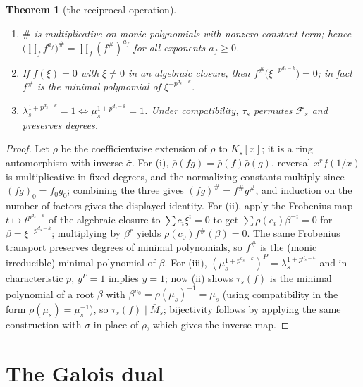 \documentclass[11pt]{article}
\newtheorem{theorem}{Theorem}[section]
\theoremstyle{definition}
\theoremstyle{remark}
\begin{document}
\begin{theorem}[the reciprocal operation]\label{thm:T2}
\begin{enumerate}
\item[(i)] \(\#\) is multiplicative on monic polynomials with nonzero
constant term; hence
\(\big(\prod_f f^{a_f}\big)^{\#} = \prod_f (f^{\#})^{a_f}\) for all
exponents \(a_f \ge 0\).
\item[(ii)] If \(f(\xi) = 0\) with \(\xi \ne 0\) in an algebraic
closure, then \(f^{\#}\big(\xi^{-p^{d_s-k}}\big) = 0\); in fact
\(f^{\#}\) is the minimal polynomial of \(\xi^{-p^{d_s-k}}\).
\item[(iii)] \(\lambda_s^{1+p^{d_s-k}} = 1 \iff
\mu_s^{1+p^{d_s-k}} = 1\). Under compatibility, \(\tau_s\) permutes
\(\mathcal{F}_s\) and preserves degrees.
\end{enumerate}
\end{theorem}

\begin{proof}
Let \(\bar\rho\) be the coefficientwise extension of \(\rho\) to
\(K_s[x]\); it is a ring automorphism with inverse \(\bar\sigma\).
For (i), \(\overline\rho(fg) = \bar\rho(f)\bar\rho(g)\), reversal
\(x^{r}f(1/x)\) is multiplicative in fixed degrees, and the normalizing
constants multiply since \((fg)_0 = f_0 g_0\); combining the three gives
\((fg)^{\#} = f^{\#} g^{\#}\), and induction on the number of factors
gives the displayed identity. For (ii), apply the Frobenius map
\(t \mapsto t^{p^{d_s-k}}\) of the algebraic closure to
\(\sum c_i \xi^i = 0\) to get \(\sum \rho(c_i) \beta^{-i} = 0\) for
\(\beta = \xi^{-p^{d_s-k}}\); multiplying by \(\beta^r\) yields
\(\rho(c_0) f^{\#}(\beta) = 0\). The same Frobenius transport preserves
degrees of minimal polynomials, so \(f^{\#}\) is the (monic irreducible)
minimal polynomial of \(\beta\). For (iii),
\((\mu_s^{1+p^{d_s-k}})^P = \lambda_s^{1+p^{d_s-k}}\) and in
characteristic \(p\), \(y^P = 1\) implies \(y = 1\); now (ii) shows
\(\tau_s(f)\) is the minimal polynomial of a root \(\beta\) with
\(\beta^{n_0} = \rho(\mu_s)^{-1} = \mu_s\) (using compatibility in the
form \(\rho(\mu_s) = \mu_s^{-1}\)), so \(\tau_s(f) \mid \bar M_s\);
bijectivity follows by applying the same construction with \(\sigma\) in
place of \(\rho\), which gives the inverse map.
\end{proof}

\section{The Galois dual}\label{sec:dual}
\end{document}
